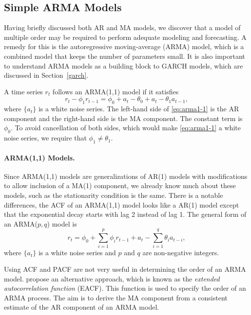 \pagebreak
\subsection{Simple ARMA Models}
Having briefly discussed both AR and MA models, we discover that a model of multiple order may be required to perform adequate modeling and forecasting. A remedy for this is the autoregressive moving-average (ARMA) model, which is a combined model that keeps the number of parameters small. It is also important to understand ARMA models as a building block to GARCH models, which are discussed in Section~\ref{garch}.

A time series $r_t$ follows an ARMA(1,1) model if it satisfies
\begin{equation}
r_t - \phi_1 r_{t-1} = \phi_0 + a_t - \theta_0 + a_t - \theta_1 a_{t-1},
\label{eq:arma1-1}
\end{equation}
where $\{a_t\}$ is a white noise series. The left-hand side of \eqref{eq:arma1-1} is the AR component and the right-hand side is the MA component. The constant term is $\phi_0$. To avoid cancellation of both sides, which would make \eqref{eq:arma1-1} a white noise series, we require that $\phi_1 \ne \theta_1$.

\paragraph{ARMA(1,1) Models.} Since ARMA(1,1) models are generalizations of AR(1) models with modifications to allow inclusion of a MA(1) component, we already know much about these models, such as the stationarity condition is the same. There is a notable differences, the ACF of an ARMA(1,1) model looks like a AR(1) model except that the exponential decay starts with lag 2 instead of lag 1. The general form of an ARMA($p,q$) model is
\[
r_t = \phi_0 + \sum^p_{i=1} \phi_i r_{t-1} + a_t - \sum^q_{i=1} \theta_i a_{t-i},
\]
where $\{a_t\}$ is a white noise series and $p$ and $q$ are non-negative integers.

Using ACF and PACF are not very useful in determining the order of an ARMA model.  propose an alternative approach, which is known as the \emph{extended autocorrelation function} (EACF). This function is used to specify the order of an ARMA process. The aim is to derive the MA component from a consistent estimate of the AR component of an ARMA model.

